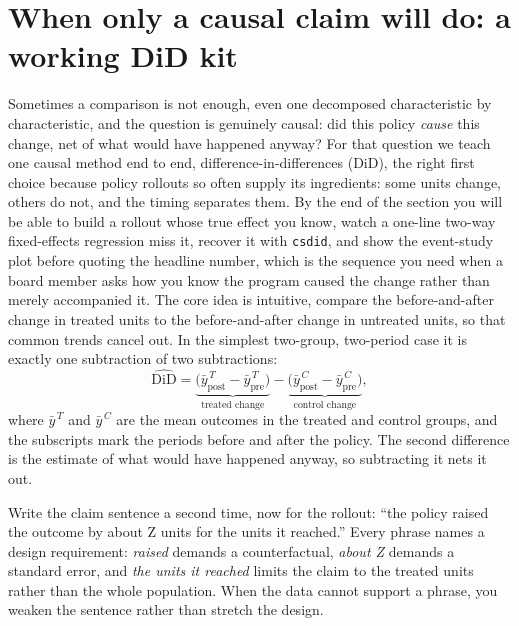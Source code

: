 \section{When only a causal claim will do: a working DiD kit}\label{sec:did}
Sometimes a comparison is not enough, even one decomposed characteristic by characteristic, and the question is genuinely causal: did this policy \emph{cause} this change, net of what would have happened anyway? For that question we teach one causal method end to end, difference-in-differences (DiD), the right first choice because policy rollouts so often supply its ingredients: some units change, others do not, and the timing separates them. By the end of the section you will be able to build a rollout whose true effect you know, watch a one-line two-way fixed-effects regression miss it, recover it with \texttt{csdid}, and show the event-study plot before quoting the headline number, which is the sequence you need when a board member asks how you know the program caused the change rather than merely accompanied it. The core idea is intuitive, compare the before-and-after change in treated units to the before-and-after change in untreated units, so that common trends cancel out. In the simplest two-group, two-period case it is exactly one subtraction of two subtractions:
\[
\widehat{\text{DiD}}
=\underbrace{\big(\bar y^{\,T}_{\text{post}}-\bar y^{\,T}_{\text{pre}}\big)}_{\text{treated change}}
-\underbrace{\big(\bar y^{\,C}_{\text{post}}-\bar y^{\,C}_{\text{pre}}\big)}_{\text{control change}},
\]
where $\bar y^{\,T}$ and $\bar y^{\,C}$ are the mean outcomes in the treated and control groups, and the subscripts mark the periods before and after the policy. The second difference is the estimate of what would have happened anyway, so subtracting it nets it out.

Write the claim sentence a second time, now for the rollout: \enquote{the policy raised the outcome by about Z units for the units it reached.} Every phrase names a design requirement: \emph{raised} demands a counterfactual, \emph{about Z} demands a standard error, and \emph{the units it reached} limits the claim to the treated units rather than the whole population. When the data cannot support a phrase, you weaken the sentence rather than stretch the design.

